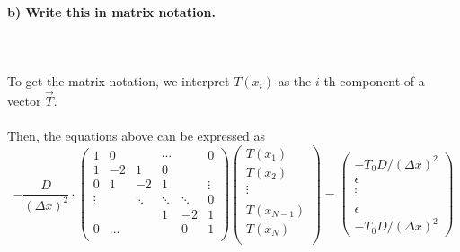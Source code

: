 \paragraph{
    b) Write this in matrix notation.
} \ \\
    \\
    To get the matrix notation, we interpret $T(x_i)$ as the 
    $i$-th component of a vector $\vec{T}$. \\
    \\
    Then, the equations above can be expressed as
    \begin{equation}
        -\frac{D}{(\Delta x)^2} \cdot
        \begin{pmatrix}
            1     & 0     &        &\cdots &       & 0 \\
            1     &-2     & 1      & 0     &       &   \\
            0     & 1     & -2     & 1     &       &\vdots \\
            \vdots&       &\ddots  &\ddots & \ddots&  0\\
            &       &        &    1  &  -2   & 1 \\
            0     & \dots &        &      &   0   &1    \\
        \end{pmatrix}
        \begin{pmatrix}
            T(x_1) \\
            T(x_2)\\
            \vdots \\
            \\
            T(x_{N-1})\\
            T(x_N) \\
        \end{pmatrix}=\begin{pmatrix}
            -T_0D/(\Delta x)^2 \\
            \epsilon \\
            \vdots \\
            \\
            \epsilon \\
            -T_0D/(\Delta x)^2
        \end{pmatrix}
    \end{equation}
